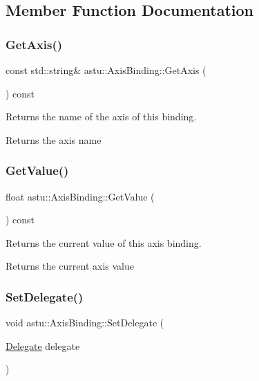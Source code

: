 \subsection{Member Function Documentation}
\mbox{\label{classastu_1_1AxisBinding_acc8029d84009c364c17268af4adf4b59}} 
\subsubsection{\texorpdfstring{Get\+Axis()}{GetAxis()}}
{\footnotesize\ttfamily const std\+::string\& astu\+::\+Axis\+Binding\+::\+Get\+Axis (\begin{DoxyParamCaption}{ }\end{DoxyParamCaption}) const}

Returns the name of the axis of this binding.

\begin{DoxyReturn}{Returns}
the axis name 
\end{DoxyReturn}
\mbox{\label{classastu_1_1AxisBinding_a94ddec4241c656506512c312251374b6}} 
\subsubsection{\texorpdfstring{Get\+Value()}{GetValue()}}
{\footnotesize\ttfamily float astu\+::\+Axis\+Binding\+::\+Get\+Value (\begin{DoxyParamCaption}{ }\end{DoxyParamCaption}) const}

Returns the current value of this axis binding.

\begin{DoxyReturn}{Returns}
the current axis value 
\end{DoxyReturn}
\mbox{\label{classastu_1_1AxisBinding_a5e7b784a68d99a9ed6fa652e55ecbad4}} 
\subsubsection{\texorpdfstring{Set\+Delegate()}{SetDelegate()}}
{\footnotesize\ttfamily void astu\+::\+Axis\+Binding\+::\+Set\+Delegate (\begin{DoxyParamCaption}\item[{\hyperlink{classastu_1_1AxisBinding_a38f398d407de503bd52019e244fa9687}{Delegate}}]{delegate }\end{DoxyParamCaption})}

